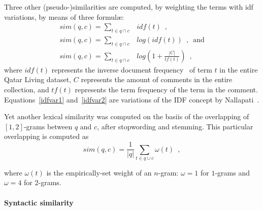 Three other (pseudo-)similarities are computed, by weighting the terms with idf 
variations, by means of three formul\ae: 
%
\begin{eqnarray}
 sim(q, c)=\sum_{t\in q\cap c} & idf(t) \enspace,		\\
 sim(q, c)=\sum_{t\in q\cap c} & log(idf(t)) \enspace, \enspace \mathrm{and} 
\label{idfvar1}\\
 sim(q, c)=\sum_{t\in q\cap c} & log\left(1 + \frac{|C|}{tf(t)}\right) \enspace 
,
\label{idfvar2}
\end{eqnarray}
% 
where $idf(t)$ represents the inverse document frequency~\cite{Jones:1972} of 
term $t$ in the entire Qatar Living dataset, $C$ represents the amount of 
comments in the entire collection, and $tf(t)$ represents the term frequency of 
the term in the comment. Equations~\ref{idfvar1} and~\ref{idfvar2} are 
variations of the IDF concept by Nallapati~.









Yet another lexical similarity was computed on the basiis of the 
overlapping of $[1, 2]$-grams between $q$ and $c$, after stopwording and 
stemming. This particular overlapping is computed as
%
\begin{equation}
 sim(q,c) = \frac{1}{|q|} \sum_{t\in q\cup c} \omega(t) \enspace ,
 \label{eq:overlap}
\end{equation}
% 

where $\omega(t)$ is the empirically-set weight of an $n$-gram: $\omega = 1$ for 
$1$-grams and $\omega = 4$ for $2$-grams.




\paragraph{Syntactic similarity}
\label{ssub:syntactic}

